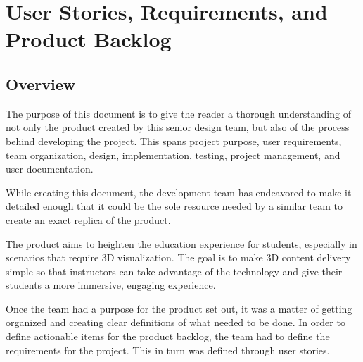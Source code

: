 
\chapter{User Stories,  Requirements, and Product Backlog}



\section{Overview}


The purpose of this document is to give the reader a thorough understanding of
not only the product created by this senior design team, but also of the
process behind developing the project. This spans project purpose, user
requirements, team organization, design, implementation, testing, project
management, and user documentation.

While creating this document,  the development team has endeavored to make it detailed enough that it could be the sole resource needed by a similar team to create an exact replica of the product.

The product aims to heighten the education experience for
students, especially in scenarios that require 3D visualization. The goal is to
make 3D content delivery simple so that instructors can take advantage of the
technology and give their students a more immersive, engaging experience.

Once the team had a purpose for the product set out, it was a matter of getting
organized and creating clear definitions of what needed to be done.
In order to define actionable items for the product backlog, the team had to define
the requirements for the project. This in turn was defined through user stories.






